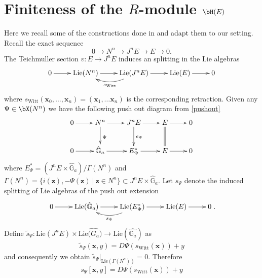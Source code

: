 \documentclass{amsart}
\numberwithin {equation}{section}
\begin{document}
\section{Finiteness of the $R$-module ${\bH}(E)$}\label{ziso}

Here we recall some of the constructions done in \cite{BS b} and adapt them
to our setting. 
Recall the exact sequence $$0\longrightarrow N^{n}\longrightarrow J^{n}E\longrightarrow E\longrightarrow 0.$$ The Teichmuller section $v:E\longrightarrow J^{n}E$ induces an splitting in the Lie algebras
\begin{align*}
 \xymatrix{
0  \ar[r] &\mathrm{Lie} (N^{n})\ar[r] &\mathrm{Lie} (J^{n}E) \ar[r] \ar@/^1pc/[l]^{s_{\mathrm{Witt}}} &\mathrm{Lie} (E)  \ar[r]&0}
\end{align*}
where $s_{\mathrm{Witt}}(\mathbf{x}_{0},\ldots,\mathbf{x}_{n})=(\mathbf{x}_{1},\ldots \mathbf{x}_{n})$ is the corresponding retraction. Given any $\Psi \in {\bX}(N^{n})$ we have the following push out diagram from \eqref{pushout}
\begin{align*}
\xymatrix{
0  \ar[r] &N^{n} \ar[d]^{\Psi} \ar[r] &J^{n}E \ar[d]^{e_{\Psi}} \ar[r] &E \ar@{=}[d] \ar[r]&0 \\
0 \ar[r] &\hat{\mathbb{G}}_{a} \ar[r] &E_{\Psi}^{*} \ar[r] & E \ar[r] &0}
\end{align*}
where $E_{\Psi}^{*}=(J^{n}E\times \hat{\mathbb{G}}_{a})/\Gamma(N^{n})$ and $\Gamma(N^{n})=\{i(\mathbf{z}),-\Psi(\mathbf{z})~|~\mathbf{z}\in N^{n}\}\subset J^{n}E\times \hat{\mathbb{G}}_{a}.$
Let $s_{\Psi}$ denote the induced splitting of Lie algebras of the 
push out extension
\begin{align*}
 \xymatrix{
0  \ar[r] &\mathrm{Lie} (\hat{\mathbb{G}}_{a})\ar[r] &\mathrm{Lie} (E_{\Psi}^{*}) \ar[r]\ar@/^1pc/[l]^{s_{\Psi}} &\mathrm{Lie} (E)  \ar[r]&0}.
\end{align*}
Define $\tilde{s}_{\Psi}:\mathrm{Lie}(J^{n}E)\times \mathrm{Lie}\hat{\mathbb({G}_{a}})\longrightarrow \mathrm{Lie}(\hat{\mathbb{G}_{a}})$ as
\begin{align*}
\tilde{s}_{\Psi}(\mathbf{x},y)=D\Psi(s_{\mathrm{Witt}}(\mathbf{x}))+y 
\end{align*}
and consequently we obtain $\tilde{s}_{\Psi}|_{\mathrm{Lie}(\Gamma(N^{n}))}=0$. Therefore 
\begin{align}\label{s_Witt_def}
s_{\Psi}[\mathbf{x},y]=D\Psi(s_{\mathrm{Witt}}(\mathbf{x}))+y 
\end{align}
\end{document}
